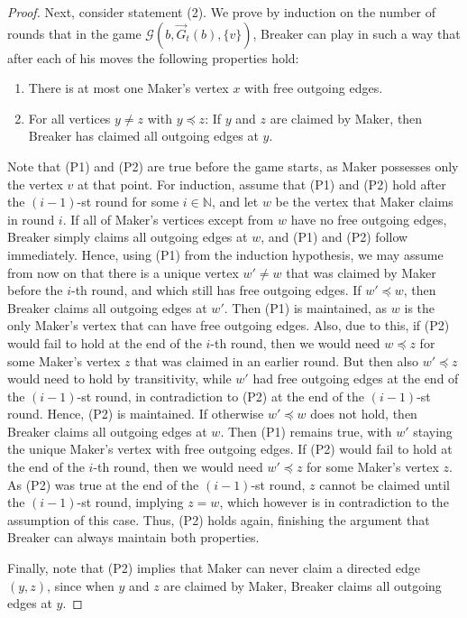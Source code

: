 \documentclass[reqno, 12pt]{amsart}
\numberwithin{equation}{section}
\numberwithin{figure}{section}
\begin{document}
\begin{proof}
Next, consider statement (2).
We prove by induction on the number of rounds that in the game 
$\mathcal{G}(b,\vec{G}_t(b),\{v\})$, Breaker can play in such a way that after each of his moves the following properties hold:
\begin{enumerate}
\item[(P1)] There is at most one Maker's vertex $x$ with free outgoing edges. 
\item[(P2)] For all vertices $y\neq z$ with $y \preccurlyeq z$: If $y$ and $z$ are claimed by Maker, then Breaker has claimed all outgoing edges at $y$.
\end{enumerate}
Note that (P1) and (P2) are true before the game starts, as Maker possesses only the vertex $v$ at that point. For induction, assume that (P1) and (P2) hold after the $(i-1)$-st round for some $i\in \mathbb{N}$, and let $w$ be the vertex that Maker claims in round $i$. If all of Maker's vertices except from
$w$ have no free outgoing edges, Breaker simply claims all outgoing edges at $w$, and (P1) and (P2) follow immediately.
Hence, using (P1) from the induction hypothesis, we may assume from now on that there is a unique vertex $w'\neq w$
that was claimed by Maker before the $i$-th round, and which still has free outgoing edges.
If $w' \preccurlyeq w$,
then Breaker claims all outgoing edges at $w'$. Then (P1) is maintained, as $w$ is the only Maker's vertex that can have free outgoing edges. Also, due to this, if (P2) would fail to hold
at the end of the $i$-th round, then we would need $w \preccurlyeq z$ for some Maker's vertex $z$ that was claimed in an earlier round. But then also $w' \preccurlyeq z$ would need to hold by transitivity, while $w'$ had free outgoing edges at the end of the $(i-1)$-st round, in contradiction to (P2) at the end of the $(i-1)$-st round. Hence, (P2) is maintained.
If otherwise $w' \preccurlyeq w$ does not hold, then Breaker claims all outgoing edges at $w$. Then (P1) remains true, with $w'$ staying the unique Maker's vertex with free outgoing edges.
If (P2) would fail to hold at the end of the $i$-th round, 
then we would need $w' \preccurlyeq z$ for some Maker's vertex $z$. As (P2) was true at the end of the $(i-1)$-st round,
$z$ cannot be claimed until the $(i-1)$-st round, implying
$z=w$, which however is in contradiction to the assumption of this case. Thus, (P2) holds again, finishing the argument that Breaker can always maintain both properties.

Finally, note that (P2) implies that Maker can never claim a directed edge $(y,z)$, since when $y$ and $z$ are claimed by Maker, Breaker claims all outgoing edges at $y$.


\end{proof}
\end{document}
